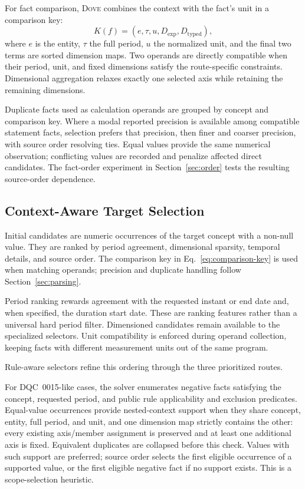 \documentclass[conference]{IEEEtran}
\newcommand{\dove}{\textsc{Dove}}
\begin{document}
For fact comparison, \dove{} combines the context with the fact's unit in a comparison key:
\begin{equation}
K(f)=(e,\tau,u,D_{\mathrm{exp}},D_{\mathrm{typed}}),
\label{eq:comparison-key}
\end{equation}
where $e$ is the entity, $\tau$ the full period, $u$ the normalized unit, and the final two terms are sorted dimension maps. Two operands are directly compatible when their period, unit, and fixed dimensions satisfy the route-specific constraints. Dimensional aggregation relaxes exactly one selected axis while retaining the remaining dimensions.

Duplicate facts used as calculation operands are grouped by concept and comparison key. Where a modal reported precision is available among compatible statement facts, selection prefers that precision, then finer and coarser precision, with source order resolving ties. Equal values provide the same numerical observation; conflicting values are recorded and penalize affected direct candidates. The fact-order experiment in Section~\ref{sec:order} tests the resulting source-order dependence.

\subsection{Context-Aware Target Selection}
\label{sec:selection}

Initial candidates are numeric occurrences of the target concept with a non-null value. They are ranked by period agreement, dimensional sparsity, temporal details, and source order. The comparison key in Eq.~\eqref{eq:comparison-key} is used when matching operands; precision and duplicate handling follow Section~\ref{sec:parsing}.

Period ranking rewards agreement with the requested instant or end date and, when specified, the duration start date. These are ranking features rather than a universal hard period filter. Dimensioned candidates remain available to the specialized selectors. Unit compatibility is enforced during operand collection, keeping facts with different measurement units out of the same program.

Rule-aware selectors refine this ordering through the three prioritized routes.

For DQC~0015-like cases, the solver enumerates negative facts satisfying the concept, requested period, and public rule applicability and exclusion predicates. Equal-value occurrences provide nested-context support when they share concept, entity, full period, and unit, and one dimension map strictly contains the other: every existing axis/member assignment is preserved and at least one additional axis is fixed. Equivalent duplicates are collapsed before this check. Values with such support are preferred; source order selects the first eligible occurrence of a supported value, or the first eligible negative fact if no support exists. This is a scope-selection heuristic.
\end{document}
